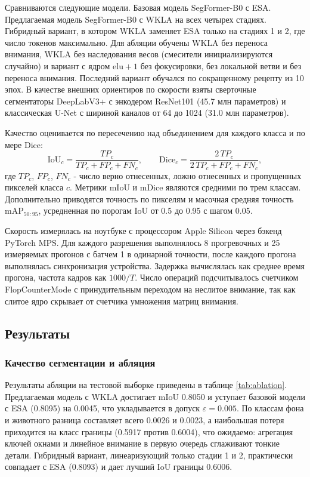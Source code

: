 \documentclass[a4paper,14pt]{article}
\numberwithin{figure}{section}
\numberwithin{table}{section}
\begin{document}
	Сравниваются следующие модели. Базовая модель SegFormer-B0 с ESA. Предлагаемая модель SegFormer-B0 с WKLA на всех четырех стадиях. Гибридный вариант,
	в котором WKLA заменяет ESA только на стадиях 1 и 2, где число токенов максимально. Для абляции обучены WKLA без переноса внимания, WKLA без наследования
	весов (смесители инициализируются случайно) и вариант с ядром $\mathrm{elu} + 1$ без фокусировки, без локальной ветви и без переноса внимания. Последний
	вариант обучался по сокращенному рецепту из 10 эпох. В качестве внешних ориентиров по скорости взяты сверточные сегментаторы DeepLabV3+ \cite{deeplab} с
	энкодером ResNet101 \cite{resnet} (45.7 млн параметров) и классическая U-Net \cite{unet} с шириной каналов от 64 до 1024 (31.0 млн параметров).

	Качество оценивается по пересечению над объединением для каждого класса и по мере Dice:
	$$
	\mathrm{IoU}_c = \frac{TP_c}{TP_c + FP_c + FN_c}, \qquad \mathrm{Dice}_c = \frac{2\, TP_c}{2\, TP_c + FP_c + FN_c},
	$$
	где $TP_c$, $FP_c$, $FN_c$ - число верно отнесенных, ложно отнесенных и пропущенных пикселей класса $c$. Метрики mIoU и mDice являются средними по трем классам.
	Дополнительно приводятся точность по пикселям и масочная средняя точность $\mathrm{mAP}_{50:95}$, усредненная по порогам IoU от 0.5 до 0.95 с шагом 0.05.

	Скорость измерялась на ноутбуке с процессором Apple Silicon через бэкенд PyTorch MPS. Для каждого разрешения выполнялось 8 прогревочных и 25 измеряемых прогонов
	с батчем 1 в одинарной точности, после каждого прогона выполнялась синхронизация устройства. Задержка вычислялась как среднее время прогона, частота кадров как
	$1000 / T$. Число операций подсчитывалось счетчиком FlopCounterMode с принудительным переходом на неслитое внимание, так как слитое ядро скрывает
	от счетчика умножения матриц внимания.

\subsection{Результаты}

\subsubsection{Качество сегментации и абляция}

	Результаты абляции на тестовой выборке приведены в таблице \ref{tab:ablation}. Предлагаемая модель с WKLA достигает mIoU 0.8050 и уступает базовой модели
	с ESA (0.8095) на 0.0045, что укладывается в допуск $\varepsilon = 0.005$. По классам фона и животного разница составляет всего 0.0026 и 0.0023, а наибольшая
	потеря приходится на класс границы (0.5917 против 0.6004), что ожидаемо: агрегация ключей окнами и линейное внимание в первую очередь сглаживают тонкие детали.
	Гибридный вариант, линеаризующий только стадии 1 и 2, практически совпадает с ESA (0.8093) и дает лучший IoU границы 0.6006.
\end{document}
